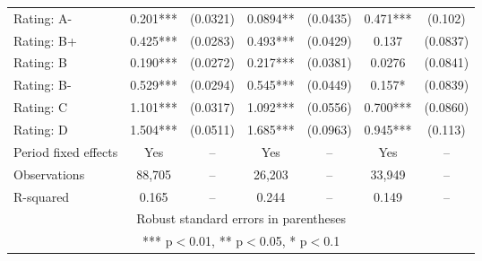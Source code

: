 \documentclass[12pt]{article}
\begin{document}
\begin{table}[H]
{\begin{tabular}{lcccccc}
    Rating: A- & 0.201*** & (0.0321) & 0.0894** & (0.0435) & 0.471*** & (0.102) \\
    Rating: B+ & 0.425*** & (0.0283) & 0.493*** & (0.0429) & 0.137 & (0.0837) \\
    Rating: B & 0.190*** & (0.0272) & 0.217*** & (0.0381) & 0.0276 & (0.0841) \\
    Rating: B- & 0.529*** & (0.0294) & 0.545*** & (0.0449) & 0.157* & (0.0839) \\
    Rating: C & 1.101*** & (0.0317) & 1.092*** & (0.0556) & 0.700*** & (0.0860) \\
    Rating: D & 1.504*** & (0.0511) & 1.685*** & (0.0963) & 0.945*** & (0.113) \\
    \midrule
    Period fixed effects & Yes & -- & Yes & -- & Yes & -- \\
    Observations & 88,705 & -- & 26,203 & -- & 33,949 & -- \\
    R-squared & 0.165 & -- & 0.244 & -- & 0.149 & -- \\
    \bottomrule
    \multicolumn{7}{c}{Robust standard errors in parentheses} \\
    \multicolumn{7}{c}{*** p$<$0.01, ** p$<$0.05, * p$<$0.1} \\
    \end{tabular}%
    }
\end{table}
\end{document}
